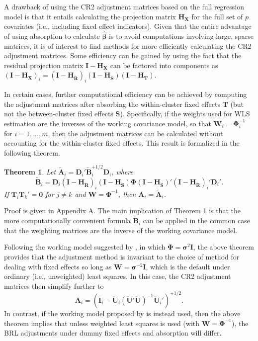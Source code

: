 \documentclass[12pt]{article}
\newtheorem{thm}{Theorem}
\newcommand{\bm}{\mathbf}
\newcommand{\bs}{\boldsymbol}
\begin{document}
A drawback of using the CR2 adjustment matrices based on the full regression model is that it entails calculating the projection matrix $\bm{H_X}$ for the full set of $p$ covariates (i.e., including fixed effect indicators). Given that the entire advantage of using absorption to calculate $\hat{\bs\beta}$ is to avoid computations involving large, sparse matrices, it is of interest to find methods for more efficiently calculating the CR2 adjustment matrices. Some efficiency can be gained by using the fact that the residual projection matrix $\bm{I} - \bm{H_X}$ can be factored into components as $\left(\bm{I} - \bm{H_X}\right)_i = \left(\bm{I} - \bm{H_{\ddot{R}}}\right)_i \left(\bm{I} - \bm{H_{\ddot{S}}}\right) \left(\bm{I} - \bm{H_T}\right)$.

In certain cases, further computational efficiency can be achieved by computing the adjustment matrices after absorbing the within-cluster fixed effects $\bm{T}$ (but not the between-cluster fixed effects $\bm{S}$). 
Specifically, if the weights used for WLS estimation are the inverses of the working covariance model, so that $\bm{W}_i = \bs\Phi_i^{-1}$ for $i = 1,...,m$, then the adjustment matrices can be calculated without accounting for the within-cluster fixed effects. 
This result is formalized in the following theorem.  

\begin{thm}
\label{thm:absorb}
Let $\bm{\tilde{A}}_i = \bm{D}_i'\bm{\tilde{B}}_i^{+1/2} \bm{D}_i$, where 
\begin{equation}
\label{eq:CR2_B_tilde}
\bm{\tilde{B}}_i = \bm{D}_i\left(\bm{I} - \bm{H_{\ddot{R}}}\right)_i \left(\bm{I} - \bm{H_{\ddot{S}}}\right) \bs\Phi \left(\bm{I} - \bm{H_{\ddot{S}}}\right)' \left(\bm{I} - \bm{H_{\ddot{R}}}\right)_i' \bm{D}_i'.
\end{equation}
If $\bm{T}_i \bm{T}_k' = \bm{0}$ for $j \neq k$ and $\bm{W} = \bs\Phi^{-1}$, then $\bm{A}_i = \bm{\tilde{A}}_i$. 
\end{thm}

Proof is given in Appendix A.
The main implication of Theorem \ref{thm:absorb} is that the more computationally convenient formula $\bm{\tilde{B}}_i$ can be applied in the common case that the weighting matrices are the inverse of the working covariance model.

Following the working model suggested by \citet{Bell2002bias}, in which $\bs\Phi = \bs\sigma^2 \bm{I}$, the above theorem provides that the adjustment method is invariant to the choice of method for dealing with fixed effects so long as $\bm{W} = \bs\sigma^{-2}\bm{I}$, which is the default under ordinary (i.e., unweighted) least squares.
In this case, the CR2 adjustment matrices then simplify further to \[
\bm{A}_i = \left(\bm{I}_i - \bm{\ddot{U}}_i\left(\bm{\ddot{U}}'\bm{\ddot{U}}\right)^{-1}\bm{\ddot{U}}_i'\right)^{+1/2}. \]
In contrast, if the working model proposed by \citet{Imbens2015robust} is instead used, then the above theorem implies that unless weighted least squares is used (with $\bm{W} = \bs\Phi^{-1}$), the BRL adjustments under dummy fixed effects and absorption will differ. 
\end{document}
